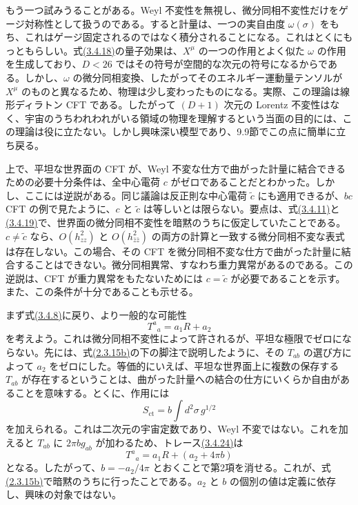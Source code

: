 もう一つ試みうることがある。Weyl 不変性を無視し、微分同相不変性だけをゲージ対称性として扱うのである。すると計量は、一つの実自由度 $\omega(\sigma)$ をもち、これはゲージ固定されるのではなく積分されることになる。これはとくにもっともらしい。式\hyperref[eq:3.4.18]{(3.4.18)}の量子効果は、$X^\mu$ の一つの作用とよく似た $\omega$ の作用を生成しており、$D<26$ ではその符号が空間的な次元の符号になるからである。しかし、$\omega$ の微分同相変換、したがってそのエネルギー運動量テンソルが $X^\mu$ のものと異なるため、物理は少し変わったものになる。実際、この理論は線形ディラトン CFT である。したがって $(D+1)$ 次元の Lorentz 不変性はなく、宇宙のうちわれわれがいる領域の物理を理解するという当面の目的には、この理論は役に立たない。しかし興味深い模型であり、9.9節でこの点に簡単に立ち戻る。

上で、平坦な世界面の CFT が、Weyl 不変な仕方で曲がった計量に結合できるための必要十分条件は、全中心電荷 $c$ がゼロであることだとわかった。しかし、ここには逆説がある。同じ議論は反正則な中心電荷 $\tilde c$ にも適用できるが、$bc$ CFT の例で見たように、$c$ と $\tilde c$ は等しいとは限らない。要点は、式\hyperref[eq:3.4.11]{(3.4.11)}と\hyperref[eq:3.4.19]{(3.4.19)}で、世界面の微分同相不変性を暗黙のうちに仮定していたことである。$c\ne\tilde c$ なら、$O(h_{zz}^2)$ と $O(h_{\bar z\bar z}^2)$ の両方の計算と一致する微分同相不変な表式は存在しない。この場合、その CFT を微分同相不変な仕方で曲がった計量に結合することはできない。微分同相異常、すなわち重力異常があるのである。この逆説は、CFT が重力異常をもたないためには $c=\tilde c$ が必要であることを示す。また、この条件が十分であることも示せる。


まず式\hyperref[eq:3.4.8]{(3.4.8)}に戻り、より一般的な可能性
\begin{equation}
T^a{}_a=a_1R+a_2
\tag{3.4.24}\label{eq:3.4.24}
\end{equation}
を考えよう。これは微分同相不変性によって許されるが、平坦な極限でゼロにならない。先には、式\hyperref[eq:2.3.15b]{(2.3.15b)}の下の脚注で説明したように、その $T_{ab}$ の選び方によって $a_2$ をゼロにした。等価的にいえば、平坦な世界面上に複数の保存する $T_{ab}$ が存在するということは、曲がった計量への結合の仕方にいくらか自由があることを意味する。とくに、作用には
\begin{equation}
S_{\mathrm{ct}}=b\int d^2\sigma\,g^{1/2}
\tag{3.4.25}\label{eq:3.4.25}
\end{equation}
を加えられる。これは二次元の宇宙定数であり、Weyl 不変ではない。これを加えると $T_{ab}$ に $2\pi b g_{ab}$ が加わるため、トレース\hyperref[eq:3.4.24]{(3.4.24)}は
\begin{equation}
T^a{}_a=a_1R+(a_2+4\pi b)
\tag{3.4.26}\label{eq:3.4.26}
\end{equation}
となる。したがって、$b=-a_2/4\pi$ とおくことで第2項を消せる。これが、式\hyperref[eq:2.3.15b]{(2.3.15b)}で暗黙のうちに行ったことである。$a_2$ と $b$ の個別の値は定義に依存し、興味の対象ではない。

